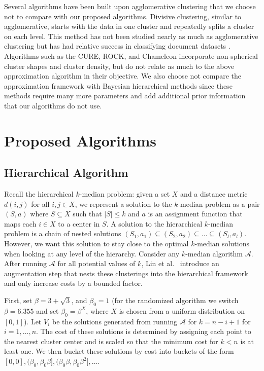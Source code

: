 \documentclass[conference, 10pt, final]{IEEEtran}
\begin{document}
Several algorithms have been built upon agglomerative clustering that we choose not to compare with our proposed algorithms. Divisive clustering, similar to agglomerative, starts with the data in one cluster and repeatedly splits a cluster on each level. This method has not been studied nearly as much as agglomerative clustering \cite{ESL} but has had relative success in classifying document datasets \cite{Zhao}.  Algorithms such as the CURE, ROCK, and Chameleon \cite{Guha_CURE, Guha_ROCK, Karypis} incorporate non-spherical cluster shapes and cluster density, but do not relate as much to the above approximation algorithm in their objective. We also choose not compare the approximation framework with Bayesian hierarchical methods since these methods require many more parameters and add additional prior information that our algorithms do not use. 

\section{Proposed Algorithms}

\subsection{Hierarchical Algorithm} 

Recall the hierarchical $k$-median problem: given a set $X$ and a distance metric $d(i,j)$ for all $i,j \in X$, we represent a solution to the $k$-median problem as a pair $(S, a)$ where $S \subseteq X$ such that $|S| \leq k$ and $a$ is an assignment function that maps each $i \in X$ to a center in $S$.
 A solution to the hierarchical $k$-median problem is a chain of nested solutions $(S_1, a_1) \subseteq (S_2, a_2) \subseteq \ldots \subseteq (S_l, a_l)$. However, we want this solution to stay close to the optimal $k$-median solutions when looking at any level of the hierarchy.  
Consider any $k$-median algorithm $\mathcal{A}$. After running $\mathcal{A}$ for all potential values of $k$, Lin et al.~\cite{Lin} introduce an augmentation step that nests these clusterings into the hierarchical framework and only increase costs by a bounded factor. 

First, set $\beta = 3+\sqrt{3}$, and $\beta_0 = 1$ (for the randomized algorithm we switch $\beta = 6.355$ and set $\beta_0 = \beta^X$, where $X$ is chosen from a uniform distribution on $[0,1]$). Let $V_i$ be the solutions generated from running $\mathcal{A}$ for $k=n-i+1$ for $i=1, \ldots, n$. The cost of these solutions is determined by assigning each point to the nearest cluster center and is scaled so that the minimum cost for $k<n$ is at least one. We then bucket these solutions by cost into buckets of the form $[0,0], (\beta_0, \beta_0 \beta], (\beta_0 \beta, \beta_0 \beta^2], \ldots $. 
\end{document}
